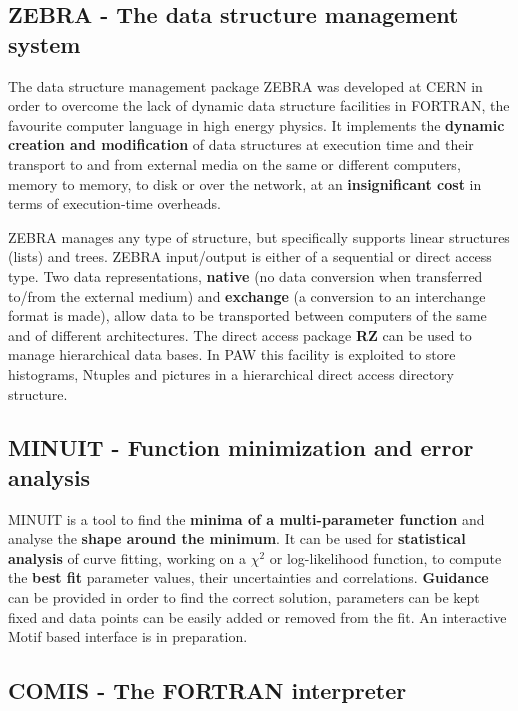 \subsection{ZEBRA - The data structure management system}

The data structure management package ZEBRA
was developed at CERN in order to overcome the lack of dynamic
data structure facilities in FORTRAN, the favourite computer language
in high energy physics. It implements the {\bf dynamic
creation and modification} of data structures at execution time
and their transport
to and from external media on the same or different computers, memory
to memory, to disk or over the network, at an
{\bf insignificant cost} in terms of execution-time overheads.
 
ZEBRA manages any type of structure, but specifically
supports linear structures (lists) and trees.
ZEBRA input/output is either of a sequential or direct access type.
Two data representations,
{\bf native} (no data conversion when transferred to/from the
external medium) and {\bf exchange} (a conversion to an
interchange format is made), allow data to be transported between
computers of the same and of different architectures.
The direct access package {\bf RZ} can be used
to manage hierarchical data bases. In PAW this facility is exploited
to store histograms, Ntuples and pictures in a hierarchical direct access
directory structure.

\subsection{MINUIT - Function minimization and error analysis}
 
MINUIT is a tool to find the {\bf minima of a
multi-parameter function} and
analyse the {\bf shape around the minimum}. It can be used for
{\bf statistical analysis} of
curve fitting, working on a \(\chi^2\) or log-likelihood function,
to compute the {\bf best fit} parameter values, their uncertainties and
correlations. {\bf Guidance} can be provided in order to find the
correct solution, parameters can be kept fixed and data points
can be easily added or removed from the fit. An interactive Motif based
interface is in preparation.

\subsection{COMIS - The FORTRAN interpreter}

